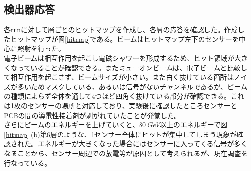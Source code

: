 \subsection{検出器応答}
各runに対して層ごとのヒットマップを作成し、各層の応答を確認した。作成したヒットマップが図\ref{hitmap}である。ビームはヒットマップ左下のセンサーを中心に照射を行った。\\
電子ビームは相互作用を起こし電磁シャワーを形成するため、ヒット領域が大きくなっていることが確認できる。またミューオンビームは、電子ビームと比較して相互作用を起こさず、ビームサイズが小さい。また白く抜けている箇所はノイズが多いためマスクしている、あるいは信号がないチャンネルであるが、ビームの種類によらず全体を通して4つほど四角く抜けている部分が確認できる。これは1枚のセンサーの場所と対応しており、実験後に確認したところセンサーとPCBの間の導電性接着剤が剥がれていたことが発覚した。\\
さらにビームのエネルギーを上げていくと、$\SI{80}{GeV}$以上のエネルギーで図\ref{hitmap} (b)第6層のような、1センサー全体にヒットが集中してしまう現象が確認された。エネルギーが大きくなった場合にはセンサーに入ってくる信号が多くなることから、センサー周辺での放電等が原因として考えられるが、現在調査を行なっている。
